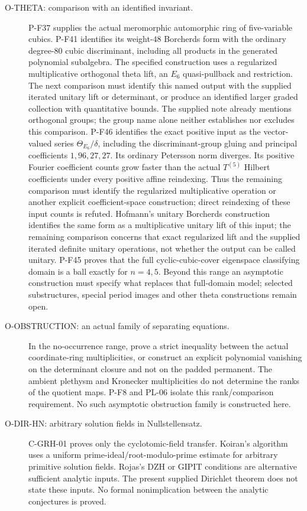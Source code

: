 \documentclass[11pt,a4paper]{article}
\begin{document}
\begin{description}
\item[O-THETA: comparison with an identified invariant.]
P-F37 supplies the actual meromorphic automorphic ring of
five-variable cubics. P-F41 identifies its weight-$48$
Borcherds form with the ordinary degree-$80$ cubic discriminant,
including all products in the generated polynomial subalgebra.
The specified construction uses a regularized multiplicative
orthogonal theta lift, an $E_6$ quasi-pullback and restriction.
The next comparison must identify this named output with the
supplied iterated unitary lift or determinant, or produce an
identified larger graded collection with quantitative bounds.
The supplied note already mentions orthogonal groups; the group
name alone neither establishes nor excludes this comparison.
P-F46 identifies the exact positive input as the vector-valued
series $\Theta_{E_6}/\delta$, including the discriminant-group
gluing and principal coefficients $1,96,27,27$. Its ordinary
Petersson norm diverges. Its positive Fourier coefficient counts
grow faster than the actual $T^{(5)}$ Hilbert coefficients under
every positive affine reindexing. Thus the remaining comparison
must identify the regularized multiplicative operation or another
explicit coefficient-space construction; direct reindexing of
these input counts is refuted. Hofmann's unitary Borcherds
construction identifies the same form as a multiplicative
unitary lift of this input; the remaining comparison concerns
that exact regularized lift and the supplied iterated definite
unitary operations, not whether the output can be called unitary.
P-F45 proves that the full cyclic-cubic-cover eigenspace
classifying domain is a ball exactly for $n=4,5$. Beyond
this range an asymptotic construction must specify what
replaces that full-domain model; selected substructures,
special period images and other theta constructions remain open.

\item[O-OBSTRUCTION: an actual family of separating equations.]
In the no-occurrence range, prove a strict inequality between the actual
coordinate-ring multiplicities, or construct an explicit polynomial
vanishing on the determinant closure and not on the padded permanent.
The ambient plethysm and Kronecker multiplicities do not determine the
ranks of the quotient maps. P-F8 and PL-06 isolate this rank/comparison
requirement. No such asymptotic obstruction family is constructed here.

\item[O-DIR-HN: arbitrary solution fields in Nullstellensatz.]
C-GRH-01 proves only the cyclotomic-field transfer. Koiran's algorithm uses
a uniform prime-ideal/root-modulo-prime estimate for arbitrary primitive
solution fields. Rojas's DZH or GIPIT conditions are alternative sufficient
analytic inputs. The present supplied Dirichlet theorem does not state
these inputs. No formal nonimplication between the analytic conjectures
is proved.


\end{description}
\end{document}
